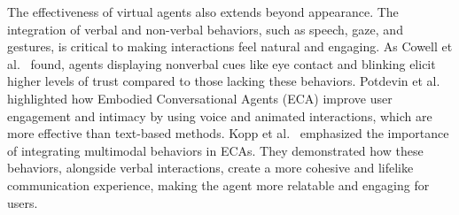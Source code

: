 The effectiveness of virtual agents also extends beyond appearance. The integration of verbal and non-verbal behaviors, such as speech, gaze, and gestures, is critical to making interactions feel natural and engaging. As Cowell et al.~\cite{cowell2005manipulation} found, agents displaying nonverbal cues like eye contact and blinking elicit higher levels of trust compared to those lacking these behaviors. Potdevin et al.~\cite{potdevin2021virtual} highlighted how Embodied Conversational Agents (ECA) improve user engagement and intimacy by using voice and animated interactions, which are more effective than text-based methods. Kopp et al.~\cite{kopp2008modeling} emphasized the importance of integrating multimodal behaviors in ECAs. They demonstrated how these behaviors, alongside verbal interactions, create a more cohesive and lifelike communication experience, making the agent more relatable and engaging for users. 
 
